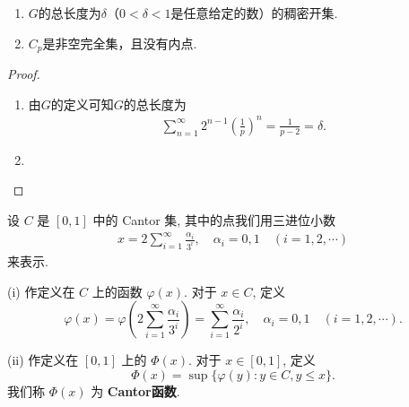 \documentclass[../../main.tex]{subfiles}%
\begin{document}
\begin{theorem}[类Cantor集的基本性质]\label{theorem:类Cantor集的基本性质}
\begin{enumerate}[(1)]
\item $G$的总长度为$\delta$（$0<\delta<1$是任意给定的数）的稠密开集.

\item $C_p$是非空完全集，且没有内点.
\end{enumerate}
\end{theorem}
\begin{proof}
\begin{enumerate}[(1)]
\item 由$G$的定义可知$G$的总长度为
\begin{align*}
\sum_{n = 1}^{\infty}2^{n - 1}\left(\frac{1}{p}\right)^n=\frac{1}{p - 2}=\delta.
\end{align*}

\item 
\end{enumerate}

\end{proof}

\begin{definition}[Cantor函数]\label{definition:Cantor函数}
设 \(C\) 是 \([0,1]\) 中的 Cantor 集, 其中的点我们用三进位小数
\begin{align*}
x = 2\sum_{i = 1}^{\infty}\frac{\alpha_i}{3^i}, \quad \alpha_i = 0,1 \quad (i = 1,2,\cdots)
\end{align*}
来表示.

(i) 作定义在 \(C\) 上的函数 \(\varphi(x)\). 对于 \(x \in C\), 定义
\[
\varphi(x)=\varphi\left(2\sum_{i = 1}^{\infty}\frac{\alpha_i}{3^i}\right)=\sum_{i = 1}^{\infty}\frac{\alpha_i}{2^i}, \quad \alpha_i = 0,1 \quad (i = 1,2,\cdots).
\]

(ii) 作定义在 \([0,1]\) 上的 \(\varPhi(x)\). 对于 \(x \in [0,1]\), 定义
\[
\varPhi(x)=\sup\{\varphi(y):y\in C,y\leqslant x\}.
\]
我们称 \(\varPhi(x)\) 为 \textbf{Cantor函数}.
\end{definition}
\end{document}
